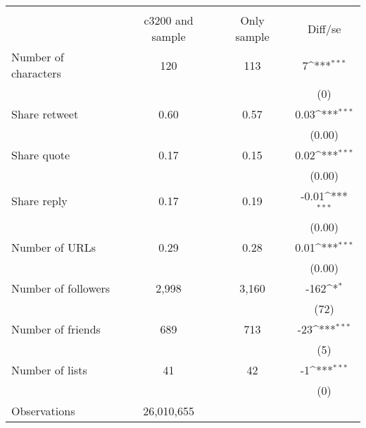 {
\def\sym#1{\ifmmode^{#1}\else\(^{#1}\)\fi}
\begin{tabular}{l*{1}{ccc}}
\hline\hline
                    &\multicolumn{3}{c}{}                           \\
                    &c3200 and sample& Only sample&     Diff/se         \\
\hline
Number of characters &         120&         113&           7\sym{***}\\
                    &            &            &         (0)         \\
Share retweet       &        0.60&        0.57&        0.03\sym{***}\\
                    &            &            &      (0.00)         \\
Share quote         &        0.17&        0.15&        0.02\sym{***}\\
                    &            &            &      (0.00)         \\
Share reply         &        0.17&        0.19&       -0.01\sym{***}\\
                    &            &            &      (0.00)         \\
Number of URLs      &        0.29&        0.28&        0.01\sym{***}\\
                    &            &            &      (0.00)         \\
Number of followers &       2,998&       3,160&        -162\sym{*}  \\
                    &            &            &        (72)         \\
Number of friends   &         689&         713&         -23\sym{***}\\
                    &            &            &         (5)         \\
Number of lists&          41&          42&          -1\sym{***}\\
                    &            &            &         (0)         \\
\hline
Observations        &  26,010,655&            &                     \\
\hline\hline
\end{tabular}
}
